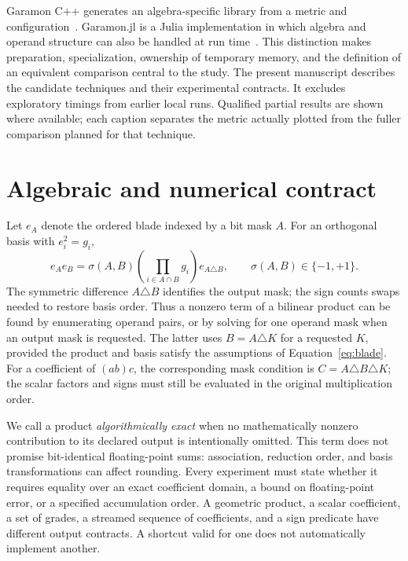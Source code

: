 \documentclass[11pt,a4paper]{article}
\begin{document}
Garamon C++ generates an algebra-specific library from a metric and
configuration~\cite{breuils2019,cppmain}. Garamon.jl is a Julia
implementation in which algebra and operand structure can also be
handled at run time~\cite{garamonjulia}. This distinction makes
preparation, specialization, ownership of temporary memory, and the
definition of an equivalent comparison central to the study. The
present manuscript describes the candidate techniques and their
experimental contracts. It excludes exploratory timings from earlier
local runs. Qualified partial results are shown where available; each
caption separates the metric actually plotted from the fuller comparison
planned for that technique.

\section{Algebraic and numerical contract}
Let \(e_A\) denote the ordered blade indexed by a bit mask \(A\).
For an orthogonal basis with \(e_i^2=g_i\),
\begin{equation}
 e_Ae_B=
 \sigma(A,B)\left(\prod_{i\in A\cap B}g_i\right)e_{A\triangle B},
 \qquad \sigma(A,B)\in\{-1,+1\}.
 \label{eq:blade}
\end{equation}
The symmetric difference \(A\triangle B\) identifies the output mask;
the sign counts swaps needed to restore basis order. Thus a nonzero
term of a bilinear product can be found by enumerating operand pairs,
or by solving for one operand mask when an output mask is requested.
The latter uses \(B=A\triangle K\) for a requested \(K\), provided
the product and basis satisfy the assumptions of
Equation~\eqref{eq:blade}. For a coefficient of \((ab)c\), the
corresponding mask condition is
\(C=A\triangle B\triangle K\); the scalar factors and signs must still
be evaluated in the original multiplication order.

We call a product \emph{algorithmically exact} when no mathematically
nonzero contribution to its declared output is intentionally omitted.
This term does not promise bit-identical floating-point sums:
association, reduction order, and basis transformations can affect
rounding. Every experiment must state whether it requires equality
over an exact coefficient domain, a bound on floating-point error, or
a specified accumulation order. A geometric product, a scalar
coefficient, a set of grades, a streamed sequence of coefficients,
and a sign predicate have different output contracts. A shortcut
valid for one does not automatically implement another.
\end{document}
